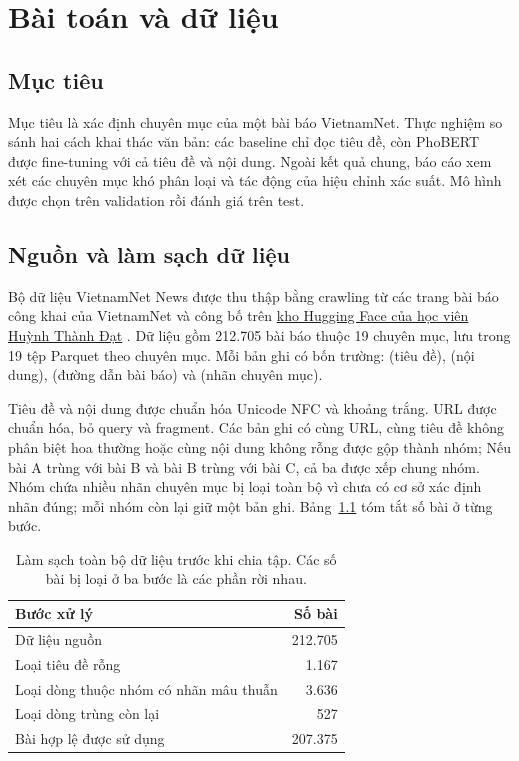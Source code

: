 \chapter{Bài toán và dữ liệu}
\section{Mục tiêu}
Mục tiêu là xác định chuyên mục của một bài báo VietnamNet. Thực nghiệm so sánh hai cách khai thác văn bản: các baseline chỉ đọc tiêu đề, còn PhoBERT được fine-tuning với cả tiêu đề và nội dung. Ngoài kết quả chung, báo cáo xem xét các chuyên mục khó phân loại và tác động của hiệu chỉnh xác suất. Mô hình được chọn trên validation rồi đánh giá trên test.

\section{Nguồn và làm sạch dữ liệu}
Bộ dữ liệu VietnamNet News được thu thập bằng crawling từ các trang bài báo công khai của VietnamNet và công bố trên \href{https://huggingface.co/datasets/dathuynh1108/vietnamnet-news}{kho Hugging Face của học viên Huỳnh Thành Đạt} \cite{vietnamnet}. Dữ liệu gồm 212.705 bài báo thuộc 19 chuyên mục, lưu trong 19 tệp Parquet theo chuyên mục. Mỗi bản ghi có bốn trường:  (tiêu đề),  (nội dung),  (đường dẫn bài báo) và  (nhãn chuyên mục).

Tiêu đề và nội dung được chuẩn hóa Unicode NFC và khoảng trắng. URL được chuẩn hóa, bỏ query và fragment. Các bản ghi có cùng URL, cùng tiêu đề không phân biệt hoa thường hoặc cùng nội dung không rỗng được gộp thành nhóm; Nếu bài A trùng với bài B và bài B trùng với bài C, cả ba được xếp chung nhóm. Nhóm chứa nhiều nhãn chuyên mục bị loại toàn bộ vì chưa có cơ sở xác định nhãn đúng; mỗi nhóm còn lại giữ một bản ghi. Bảng~\ref{tab:text-cleaning} tóm tắt số bài ở từng bước.

\begin{table}[htbp]\centering
\begin{tabularx}{\textwidth}{Xr}\toprule
Bước xử lý & Số bài\\\midrule
Dữ liệu nguồn & 212.705\\
Loại tiêu đề rỗng & 1.167\\
Loại dòng thuộc nhóm có nhãn mâu thuẫn & 3.636\\
Loại dòng trùng còn lại & 527\\
Bài hợp lệ được sử dụng & 207.375\\\bottomrule
\end{tabularx}
\caption{Làm sạch toàn bộ dữ liệu trước khi chia tập. Các số bài bị loại ở ba bước là các phần rời nhau.}
\label{tab:text-cleaning}
\end{table}


